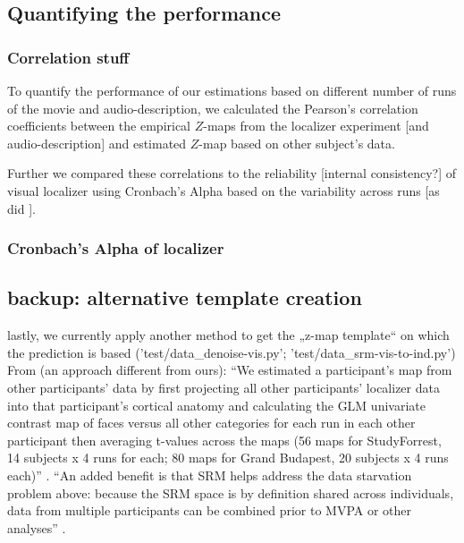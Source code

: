 \subsection{Quantifying the performance}


\subsubsection{Correlation stuff}

%
To quantify the performance of our estimations based on different number of runs
of the movie and audio-description, we calculated the Pearson's correlation
coefficients between the empirical $Z$-maps from the localizer experiment [and
audio-description] and estimated $Z$-map based on other subject's data.

%
Further we compared these correlations to the reliability [internal
consistency?] of visual localizer using Cronbach's Alpha based on the
variability across runs [as did
\citep{jiahui2020predicting}].

\subsubsection{Cronbach's Alpha of localizer}




\subsection{backup: alternative template creation}
%
lastly, we currently apply another method to get the „z-map template“ on which
the prediction is based ('test/data\_denoise-vis.py';
'test/data\_srm-vis-to-ind.py')
%
From \citep{jiahui2020predicting} (an approach different from ours): ``We
estimated a participant's map from other participants' data by first projecting
all other participants' localizer data into that participant's cortical anatomy
and calculating the GLM univariate contrast map of faces versus all other
categories for each run in each other participant then averaging t-values across
the maps (56 maps for StudyForrest, 14 subjects x 4 runs for each; 80 maps for
Grand Budapest, 20 subjects x 4 runs each)'' \citep{jiahui2020predicting}.
%
``An added benefit is that SRM helps address the data starvation problem above:
because the SRM space is by definition shared across individuals, data from
multiple participants can be combined prior to MVPA or other analyses''
\citep{cohen2017computational}.

